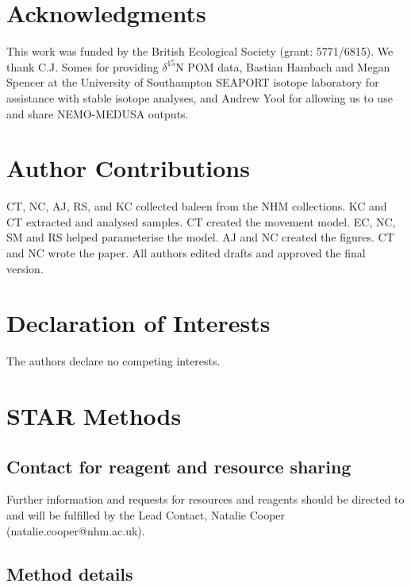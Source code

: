 \documentclass[a4paper,12pt]{article}
\begin{document}
\section{Acknowledgments}
This work was funded by the British Ecological Society (grant: 5771/6815). 
We thank C.J. Somes for providing  $\delta^{15}$N POM data, Bastian Hambach and Megan Spencer at the University of Southampton SEAPORT isotope laboratory for assistance with stable isotope analyses, and Andrew Yool for allowing us to use and share NEMO-MEDUSA outputs.

\section{Author Contributions}
CT, NC, AJ, RS, and KC collected baleen from the NHM collections. 
KC and CT extracted and analysed samples.
CT created the movement model.
EC, NC, SM and RS helped parameterise the model.
AJ and NC created the figures. 
CT and NC wrote the paper.
All authors edited drafts and approved the final version.

\section{Declaration of Interests}
The authors declare no competing interests.




\section{STAR Methods}

\subsection{Contact for reagent and resource sharing}
Further information and requests for resources and reagents should be directed to and will be fulfilled by the Lead Contact, Natalie Cooper (natalie.cooper@nhm.ac.uk).

\subsection{Method details}
\end{document}
